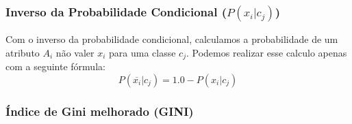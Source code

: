 \subsubsection{Inverso da Probabilidade Condicional ($P(x_i|c_j)$)}
\label{subsubsection::pc'}
Com o inverso da probabilidade condicional, calculamos a probabilidade de um atributo $A_i$ não valer $x_i$ para uma classe $c_j$. Podemos realizar esse calculo apenas com a seguinte fórmula:
\begin{equation}\label{eqn::plinhattalquec}
   P(\overline{x_i}|c_j) = 1.0 - P(x_i|c_j)
\end{equation}

\subsubsection{Índice de Gini melhorado (GINI)}
\label{subsubsection::gini}

